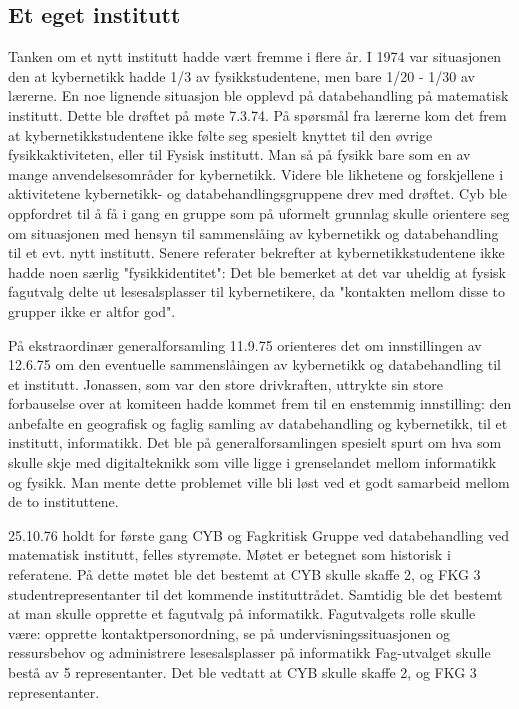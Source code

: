\documentclass[../main.tex]{subfiles}
\begin{document}
\subsection{Et eget institutt}
Tanken om et nytt institutt hadde vært fremme i flere år. I 1974 var situasjonen den at kybernetikk hadde 1/3 av fysikkstudentene, men bare 1/20 - 1/30 av lærerne. En noe lignende situasjon ble opplevd på databehandling på matematisk institutt. Dette ble drøftet på møte 7.3.74. På spørsmål fra lærerne kom det frem at kybernetikkstudentene ikke følte seg spesielt knyttet til den øvrige fysikkaktiviteten, eller til Fysisk institutt. Man så på fysikk bare som en av mange anvendelsesområder for kybernetikk. Videre ble likhetene og forskjellene i aktivitetene kybernetikk- og databehandlingsgruppene drev med drøftet. Cyb ble oppfordret til å få i gang en gruppe som på uformelt grunnlag skulle orientere seg om situasjonen med hensyn til sammenslåing av kybernetikk og databehandling til et evt. nytt institutt. Senere referater bekrefter at kybernetikkstudentene ikke hadde noen særlig "fysikkidentitet": Det ble bemerket at det var uheldig at fysisk fagutvalg delte ut lesesalsplasser til kybernetikere, da "kontakten mellom disse to grupper ikke er altfor god".

På ekstraordinær generalforsamling 11.9.75 orienteres det om innstillingen av 12.6.75 om den eventuelle sammenslåingen av kybernetikk og databehandling til et institutt. Jonassen, som var den store drivkraften, uttrykte sin store forbauselse over at komiteen hadde kommet frem til en enstemmig innstilling: den anbefalte en geografisk og faglig samling av databehandling og kybernetikk, til et institutt, informatikk. Det ble på generalforsamlingen spesielt spurt om hva som skulle skje med digitalteknikk som ville ligge i grenselandet mellom informatikk og fysikk. Man mente dette problemet ville bli løst ved et godt samarbeid mellom de to instituttene.

25.10.76 holdt for første gang CYB og Fagkritisk Gruppe ved databehandling ved matematisk institutt, felles styremøte. Møtet er betegnet som historisk i referatene. På dette møtet ble det bestemt at CYB skulle skaffe 2, og FKG 3 studentrepresentanter til det kommende instituttrådet. Samtidig ble det bestemt at man skulle opprette et fagutvalg på informatikk. Fagutvalgets rolle skulle være: opprette kontaktpersonordning, se på undervisningssituasjonen og ressursbehov og administrere lesesalsplasser på informatikk Fag-utvalget skulle bestå av 5 representanter. Det ble vedtatt at CYB skulle skaffe 2, og FKG 3 representanter.
\end{document}

